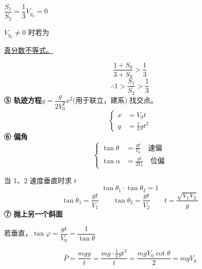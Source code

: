\noindent $\dfrac{S_1}{S_2}=\dfrac13$\qquad $V_{y_0}=0$

\noindent $V_{y_0}\neq0$ 时\quad 若为

\noindent \underline{真分数不等式。}%

\[
\frac{1+S_0}{3+S_0}>\frac13
\]
\[
\therefore 1>\frac{S_1}{S_2}>\frac13
\]%
\textbf{⑤ 轨迹方程}\quad $y=\dfrac{g}{2V_0^2}x^2$\quad (用于联立，建系) 找交点。
\[
\left\{\begin{aligned}x&=V_0t\\y&=\tfrac12gt^2\end{aligned}\right.
\]
\textbf{⑥ 偏角}
\[
\left\{\begin{aligned}
\tan\theta&=\frac{gt}{V_0}\quad\text{速偏}\\
\tan\alpha&=\frac{gt}{2V_0}\quad\text{位偏}
\end{aligned}\right.
\]

\noindent 当 1、2 速度垂直时求 $t$
\[
\tan\theta_1\cdot\tan\theta_2=1
\]
\[
\tan\theta_1=\frac{gt}{V_1}\qquad\tan\theta_2=\frac{gt}{V_2}\qquad t=\frac{\sqrt{V_1V_2}}{g}
\]
\textbf{⑦ 抛上另一个斜面}

\noindent 若垂直，$\tan\varphi=\dfrac{gt}{V_0}=\dfrac{1}{\tan\theta}$

\[
\bar P=\frac{mgy}{t}=\frac{mg\cdot\frac12gt^2}{t}=\frac{mgV_0\cot\theta}{2}=mgV_y
\]%

